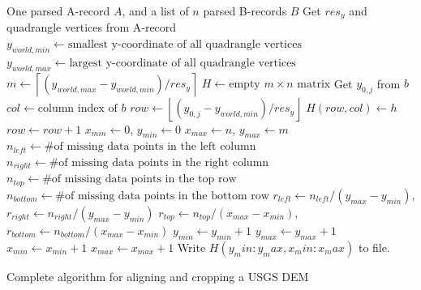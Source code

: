 \begin{algorithm}[ht]
\begin{algorithmic}
\REQUIRE One parsed A-record $A$, and a list of $n$ parsed B-records $B$
\STATE Get $res_y$ and quadrangle vertices from A-record
\STATE $y_{world,min}\gets \mbox{smallest y-coordinate of all quadrangle vertices}$
\STATE $y_{world,max}\gets \mbox{largest y-coordinate of all quadrangle vertices}$
\STATE $m \gets \left\lceil(y_{world,max}-y_{world,min})/res_y\right\rceil$
\STATE $H\gets \mbox{empty $m\times n$ matrix}$
    \STATE Get $y_{0,j}$ from $b$
    \STATE $col \gets \mbox{column index of $b$}$
    \STATE $row \gets \left\lfloor (y_{0,j}-y_{world,min})/res_y\right\rfloor$
        \STATE $H(row,col) \gets h$
        \STATE $row \gets row+1$
    \ENDFOR
\ENDFOR
\STATE $x_{min}\gets 0$, $y_{min}\gets 0$
\STATE $x_{max}\gets n$, $y_{max}\gets m$
    \STATE $n_{left}\gets \mbox{\# of missing data points in the left column}$
    \STATE $n_{right}\gets \mbox{\# of missing data points in the right column}$
    \STATE $n_{top}\gets \mbox{\# of missing data points in the top row}$
    \STATE $n_{bottom}\gets \mbox{\# of missing data points in the bottom row}$
    \STATE $r_{left}\gets n_{left}/(y_{max}-y_{min})$, $r_{right}\gets n_{right}/(y_{max}-y_{min})$
    \STATE $r_{top}\gets n_{top}/(x_{max}-x_{min})$, $r_{bottom}\gets n_{bottom}/(x_{max}-x_{min})$
        \STATE $y_{min} \gets y_{min}+1$
        \STATE $y_{max} \gets y_{max}+1$
        \STATE $x_{min} \gets x_{min}+1$
        \STATE $x_{max} \gets x_{max}+1$
    \ENDIF
\ENDWHILE
\STATE Write $H(y_min:y_max, x_min:x_max)$ to file.
\end{algorithmic}
\caption{Complete algorithm for aligning and cropping a USGS DEM}
\label{alg:demtoraw}
\end{algorithm}

